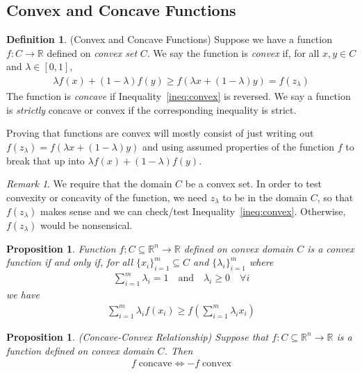\documentclass[12pt]{book}
\numberwithin{equation}{section} %
\theoremstyle{plain}
\newtheorem{prop}[thm]{Proposition}
\theoremstyle{definition}
\newtheorem{defn}[thm]{Definition}
\theoremstyle{remark}
\newtheorem*{rmk}{Remark}
\newcommand{\R}{\mathbb{R}}
\newcommand{\Rn}{\mathbb{R}^n}
\begin{document}
\subsection{Convex and Concave Functions}

\begin{defn}{(Convex and Concave Functions)}
Suppose we have a function $f:C\rightarrow \R$ defined on \emph{convex
set} $C$. We say the function is \emph{convex} if, for all $x,y\in C$
and $\lambda \in[0,1]$,
\begin{align}
  \label{ineq:convex}
  \lambda f(x) + (1-\lambda) f(y) \geq f(\lambda x + (1-\lambda)y) =
  f(z_\lambda)
\end{align}
The function is \emph{concave} if Inequality~\ref{ineq:convex} is
reversed. We say a function is \emph{strictly} concave or convex if the
corresponding inequality is strict.

Proving that functions are convex will mostly consist of just writing
out $f(z_\lambda) = f(\lambda x + (1-\lambda)y)$ and using assumed
properties of the function $f$ to break that up into $\lambda f(x) +
(1-\lambda)f(y)$.
\end{defn}
\begin{rmk}
We require that the domain $C$ be a convex set.  In order to test
convexity or concavity of the function, we need $z_\lambda$ to be in the
domain $C$, so that $f(z_\lambda)$ makes sense and we can check/test
Inequality~\ref{ineq:convex}. Otherwise, $f(z_\lambda)$ would be
nonsensical.
\end{rmk}

\begin{prop}
Function $f:C\subseteq\Rn\rightarrow \R$ defined on convex domain $C$ is
a convex function if and only if, for all $\{x_i\}_{i=1}^m\subseteq C$
and $\{\lambda_i\}_{i=1}^m$ where
\begin{align*}
  \sum^{m}_{i=1} \lambda_i = 1
  \quad \text{and} \quad \lambda_i \geq 0 \quad \forall i
\end{align*}
we have
\begin{align*}
  \sum^m_{i=1} \lambda_i f(x_i)
  \geq
  f\left(\sum^m_{i=1} \lambda_i x_i\right)
\end{align*}
\end{prop}

\begin{prop}{\emph{(Concave-Convex Relationship)}}
Suppose that $f:C\subseteq\Rn\rightarrow \R$ is a function defined on
convex domain $C$. Then
\begin{align*}
  f \; \text{concave}
  \iff
  -f \; \text{convex}
\end{align*}
\end{prop}
\end{document}
